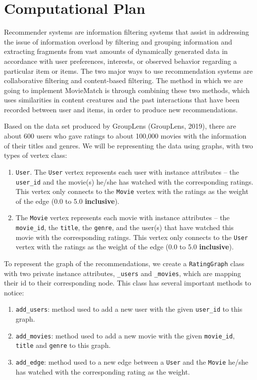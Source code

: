 \documentclass[fontsize=11pt]{article}
\begin{document}
\section*{Computational Plan}

\quad Recommender systems are information filtering systems that assist in addressing the issue of information overload by filtering and grouping information and extracting fragments from vast amounts of dynamically generated data in accordance with user preferences, interests, or observed behavior regarding a particular item or items. The two major ways to use recommendation systems are collaborative filtering and content-based filtering. The method in which we are going to implement MovieMatch is through combining these two methods, which uses similarities in content creatures and the past interactions that have been recorded between user and items, in order to produce new recommendations.

\newpage

\quad Based on the data set produced by GroupLens (GroupLens, 2019), there are about 600 users who gave ratings to about 100,000 movies with the information of their titles and genres. We will be representing the data using graphs, with two types of vertex class:

\begin{enumerate}
    \item \texttt{User}. The \texttt{User} vertex represents each user with instance attributes – the \texttt{user\_id} and the movie(s) he/she has watched with the corresponding ratings. This vertex only connects to the \texttt{Movie} vertex with the ratings as the weight of the edge (0.0 to 5.0 \textbf{inclusive}). 
    \item The \texttt{Movie} vertex represents each movie with instance attributes – the \texttt{movie\_id}, the \texttt{title}, the \texttt{genre}, and the user(s) that have watched this movie with the corresponding ratings. This vertex only connects to the \texttt{User} vertex with the ratings as the weight of the edge (0.0 to 5.0 \textbf{inclusive}). 
\end{enumerate}

\quad To represent the graph of the recommendations, we create a \texttt{RatingGraph} class with two private instance attributes,  \texttt{\_users} and \texttt{\_movies}, which are mapping their id to their corresponding node. This class has several important methods to notice:

\begin{enumerate}
    \item \texttt{add\_users}: method used to add a new user with the given \texttt{user\_id} to this graph.
    \item \texttt{add\_movies}: method used to add a new movie with the given \texttt{movie\_id}, \texttt{title} and \texttt{genre} to this graph.
    \item \texttt{add\_edge}: method used to a new edge between a \texttt{User} and the \texttt{Movie} he/she has watched with the corresponding rating as the weight. 
\end{enumerate}
\end{document}
